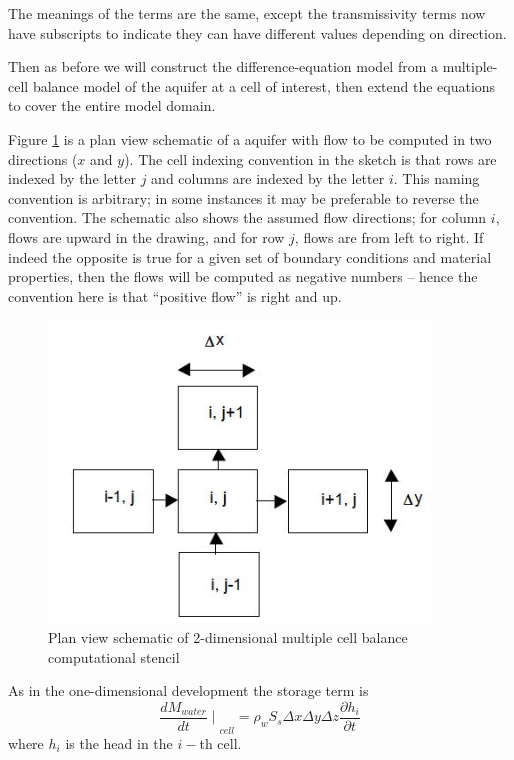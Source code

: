 The meanings of the terms are the same, except the transmissivity terms now have subscripts to indicate they can have different values depending on direction.

Then as before we will construct the difference-equation model from a multiple-cell balance model of the aquifer at a cell of interest, then extend the equations to cover the entire model domain.

Figure \ref{fig:multiple-cell-balance-2d} is a plan view schematic of a aquifer with flow to be computed in two directions ($x$ and $y$).   The cell indexing convention in the sketch is that rows are indexed by the letter $j$ and columns are indexed by the letter $i$.  This naming convention is arbitrary; in some instances it may be preferable to reverse the convention.
The schematic also shows the assumed flow directions; for column $i$, flows are upward in the drawing, and for row $j$, flows are from left to right.  If indeed the opposite is true for a given set of boundary conditions and material properties, then the flows will be computed as negative numbers -- hence the convention here is that ``positive flow'' is right and up.  
\begin{figure}[h!] %
   \centering
   \includegraphics[width=4in]{./17-SteadyGroundwaterFlow/multiple-cell-balance-2d.jpg} 
   \caption{Plan view schematic of 2-dimensional multiple cell balance computational stencil}
   \label{fig:multiple-cell-balance-2d}
\end{figure}

As in the one-dimensional development the storage term is 
\begin{equation}
{\frac{d M_{water}}{dt}\mid}_{cell} =\rho_{w} S_{s} \Delta x \Delta y \Delta z \frac{\partial h_i}{\partial t}
\end{equation}
 where $h_i$ is the head in the $i-$th cell.  
 

